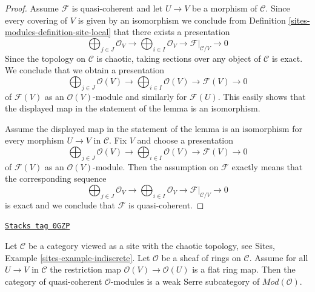\begin{proof}
Assume $\mathcal{F}$ is quasi-coherent and let $U \to V$ be a morphism
of $\mathcal{C}$. Since every covering of $V$ is given by an isomorphism
we conclude from Definition \ref{sites-modules-definition-site-local}
that there exists a presentation
$$
\bigoplus\nolimits_{j \in J} \mathcal{O}_V \longrightarrow
\bigoplus\nolimits_{i \in I} \mathcal{O}_V \longrightarrow
\mathcal{F}|_{\mathcal{C}/V} \longrightarrow 0
$$
Since the topology on $\mathcal{C}$ is chaotic, taking sections over
any object of $\mathcal{C}$ is exact. We conclude that we obtain
a presentation
$$
\bigoplus\nolimits_{j \in J} \mathcal{O}(V) \longrightarrow
\bigoplus\nolimits_{i \in I} \mathcal{O}(V) \longrightarrow
\mathcal{F}(V) \longrightarrow 0
$$
of $\mathcal{F}(V)$ as an $\mathcal{O}(V)$-module and similarly for
$\mathcal{F}(U)$. This easily shows that the displayed map in the statement
of the lemma is an isomorphism.

\medskip\noindent
Assume the displayed map in the statement of the lemma is an isomorphism
for every morphism $U \to V$ in $\mathcal{C}$. Fix $V$ and choose a
presentation
$$
\bigoplus\nolimits_{j \in J} \mathcal{O}(V) \longrightarrow
\bigoplus\nolimits_{i \in I} \mathcal{O}(V) \longrightarrow
\mathcal{F}(V) \longrightarrow 0
$$
of $\mathcal{F}(V)$ as an $\mathcal{O}(V)$-module. Then the assumption
on $\mathcal{F}$ exactly means that the corresponding sequence
$$
\bigoplus\nolimits_{j \in J} \mathcal{O}_V \longrightarrow
\bigoplus\nolimits_{i \in I} \mathcal{O}_V \longrightarrow
\mathcal{F}|_{\mathcal{C}/V} \longrightarrow 0
$$
is exact and we conclude that $\mathcal{F}$ is quasi-coherent.
\end{proof}

\begin{lemma}
\label{sites-modules-lemma-chaotic-flat-quasi-coherent}
\href{https://stacks.math.columbia.edu/tag/0GZP}{\texttt{Stacks tag 0GZP}}

Let $\mathcal{C}$ be a category viewed as a site with the chaotic
topology, see Sites, Example \ref{sites-example-indiscrete}.
Let $\mathcal{O}$ be a sheaf of rings on $\mathcal{C}$.
Assume for all $U \to V$ in $\mathcal{C}$ the restriction map
$\mathcal{O}(V) \to \mathcal{O}(U)$ is a flat ring map.
Then the category of quasi-coherent $\mathcal{O}$-modules is
a weak Serre subcategory of $\textit{Mod}(\mathcal{O})$.
\end{lemma}

